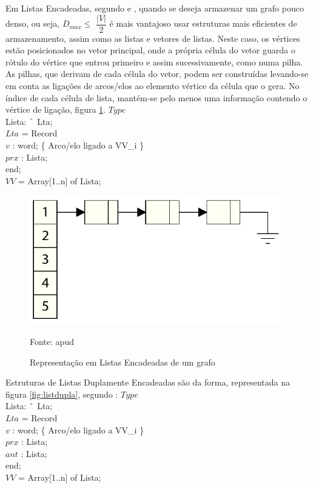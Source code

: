 Em Listas Encadeadas, segundo \cite{negreirosbook} e \cite{cormen}, quando se deseja armazenar um grafo pouco denso, ou seja,
$D_{max} \leqslant$ $\dfrac{|V|}{2}$ é mais vantajoso usar estruturas mais eficientes de armazenamento, assim como as listas
e vetores de listas. Neste caso, os vértices estão posicionados no vetor principal, onde a própria célula do vetor
guarda o rótulo do vértice que entrou primeiro e assim sucessivamente, como numa pilha. As pilhas, que derivam de cada
célula do vetor, podem ser construídas levando-se em conta as ligações de arcos/elos ao elemento vértice da célula
que o gera. No índice de cada célula de lista, mantém-se pelo menos uma informação contendo o vértice de ligação,
figura \ref{fig:listaencad}.
\FloatBarrier
\noindent $Type$\\
Lista: $\string^$ Lta;\\
$Lta$ = Record\\
$v$ : word; \{ Arco/elo ligado a VV\_i \}\\
$prx$ : Lista;\\
end;\\
$VV$ = Array[1..n] of Lista;\\

\begin{figure}[htbp]
\centering
 \includegraphics[width=.65\textwidth]{chapters/fig/listaencad.png}
\caption{Representação em Listas Encadeadas de um grafo}
Fonte: \cite{dynagraph} apud \cite{negreirosbook}
\label{fig:listaencad}
\end{figure}

Estruturas de Listas Duplamente Encadeadas são da forma, representada na figura \ref{fig:listdupla}, segundo \cite{negreirosbook}:
\FloatBarrier
\noindent $Type$\\
Lista: $\string^$ Lta;\\
$Lta$ = Record\\
$v$ : word; \{ Arco/elo ligado a VV\_i \}\\
$prx$ : Lista;\\
$ant$ : Lista;\\
end;\\
$VV$ = Array[1..n] of Lista;\\

